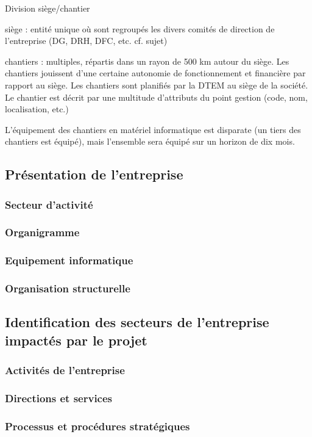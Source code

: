 Division siège/chantier

siège : entité unique où sont regroupés les divers comités de direction de l'entreprise (DG, DRH, DFC, etc. cf. sujet)

chantiers : multiples, répartis dans un rayon de 500 km autour du siège.
Les chantiers jouissent d'une certaine autonomie de fonctionnement et
financière par rapport au siège. Les chantiers sont planifiés par la DTEM
au siège de la société. Le chantier est décrit par une multitude
d'attributs du point gestion (code, nom, localisation, etc.)

L'équipement des chantiers en matériel informatique est disparate (un tiers
des chantiers est équipé), mais l'ensemble sera équipé sur un horizon de
dix mois. 

\subsection{Présentation de l'entreprise}

\subsubsection{Secteur d'activité}
\subsubsection{Organigramme}
\subsubsection{Equipement informatique}
\subsubsection{Organisation structurelle}


\subsection{Identification des secteurs de l'entreprise impactés par le projet}

\subsubsection{Activités de l'entreprise}
\subsubsection{Directions et services}
\subsubsection{Processus et procédures stratégiques}
